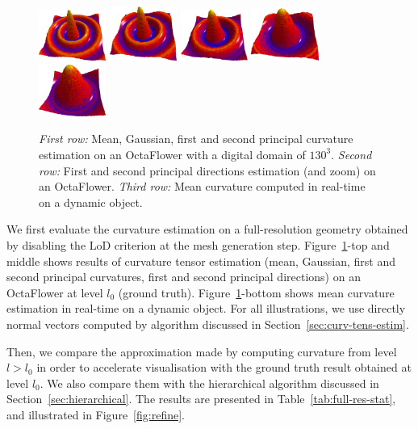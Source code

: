 \documentclass{llncs}
\begin{document}
\begin{figure}
\begin{center}
    {\includegraphics[width=2.2cm]{figs/function_mean_0}}
    {\includegraphics[width=2.2cm]{figs/function_mean_1}}
    {\includegraphics[width=2.2cm]{figs/function_mean_2}}
    {\includegraphics[width=2.2cm]{figs/function_mean_3}}
    {\includegraphics[width=2.2cm]{figs/function_mean_4}}
  \end{center}
  \caption{\emph{First row:} Mean, Gaussian, first and second principal curvature estimation on an OctaFlower with a digital domain of $130^3$.
  \emph{Second row:} First and second principal directions estimation (and zoom) on an OctaFlower.
  \emph{Third row:} Mean curvature computed in real-time on a dynamic object.}
  \label{fig:full}
\end{figure}

We first evaluate the curvature estimation on a full-resolution geometry
obtained by disabling the LoD criterion at the mesh generation step.
Figure~\ref{fig:full}-top and middle shows results of curvature tensor
estimation (mean, Gaussian, first and second principal curvatures, first and
second principal directions) on an OctaFlower at level $l_0$ (ground truth).
Figure~\ref{fig:full}-bottom shows mean curvature estimation in real-time on a
dynamic object. For all illustrations, we use directly normal vectors computed
by algorithm discussed in Section~\ref{sec:curv-tens-estim}.

Then, we compare the approximation made by computing curvature from level $l >
l_0$ in order to accelerate visualisation with the ground truth result obtained
at level $l_0$. We also compare them with the hierarchical algorithm discussed
in Section~\ref{sec:hierarchical}. The results are presented in
Table~\ref{tab:full-res-stat}, and illustrated in Figure~\ref{fig:refine}.
\end{document}

